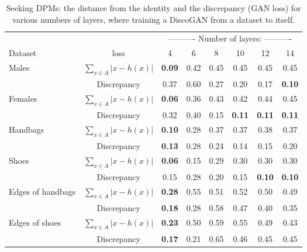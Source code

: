 \documentclass{article} %
\begin{document}
\begin{table}[h]\caption{Seeking DPMs: the distance from the identity and the discrepancy (GAN loss) for various numbers of layers, where training a DiscoGAN from a dataset to itself. \label{tab:c001}} 

\begin{center}
\begin{tabular}{lccccccc}
\toprule
& & \multicolumn{6}{c}{---------- Number of layers: ----------}\\
Dataset & loss & 4 & 6 & 8 & 10 & 12 & 14\\
\midrule
Males & $\sum_{x\in A}|x-h(x)|$ & \bf{0.09} & 0.42 & 0.45 & 0.45 & 0.45 & 0.45 \\
& Discrepancy & 0.37 & 0.60 & 0.27 & 0.20 & 0.17 & \bf{0.10} \\     
\midrule                   
Females & $\sum_{x\in A}|x-h(x)|$ & \bf{0.06} & 0.36 & 0.43 & 0.42 & 0.44 & 0.45 \\
& Discrepancy & 0.32 & 0.40 & 0.15 & \bf{0.11} &  \bf{0.11} & \bf{0.11} \\   
    \midrule  
Handbags & $\sum_{x\in A}|x-h(x)|$ & \bf{0.10} & 0.28 & 0.37 & 0.37 & 0.38 & 0.37 \\
& Discrepancy& \bf{0.13} & 0.28 & 0.24 & 0.14 & 0.15 & 0.20 \\
\midrule 
Shoes& $\sum_{x\in A}|x-h(x)|$ & \bf{0.06} & 0.15 & 0.29 & 0.30 & 0.30 & 0.30 \\
& Discrepancy & 0.15 & 0.28 & 0.20 & 0.15 & \bf{0.10} & \bf{0.10} \\
\midrule   


Edges of handbags& $\sum_{x\in A}|x-h(x)|$ & \bf{0.28} & 0.55 & 0.51 & 0.52 & 0.50 & 0.49 \\
& Discrepancy & \bf{0.18} & 0.28 & 0.58 & 0.47 & 0.40 & 0.35 \\
\midrule       
Edges of shoes& $\sum_{x\in A}|x-h(x)|$ & \bf{0.23} & 0.50 & 0.59 & 0.55 & 0.49 & 0.43 \\
& Discrepancy & \bf{0.17} & 0.21 & 0.65 & 0.46 & 0.45 & 0.45 \\
\bottomrule
\end{tabular}
\end{center}
\end{table}
\end{document}
